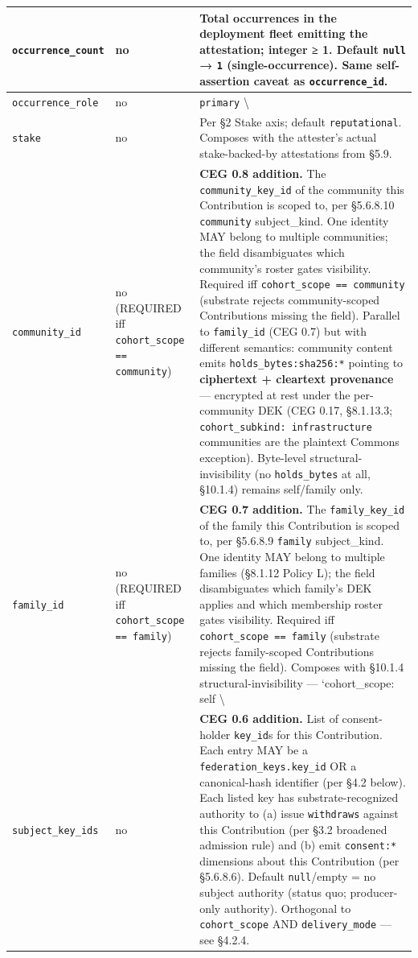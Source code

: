 \documentclass[10pt]{article}
\begin{document}
{\begin{longtable}{|p{5.33cm}|p{5.33cm}|p{5.33cm}|}
\texttt{occurrence\_count} & no & Total occurrences in the deployment fleet emitting the attestation; integer ≥ 1. Default \texttt{null} → \texttt{1} (single-occurrence). Same self-assertion caveat as \texttt{occurrence\_id}. \\ \hline
\texttt{occurrence\_role} & no & \texttt{primary} \textbackslash{} \\ \hline
\texttt{stake} & no & Per §2 Stake axis; default \texttt{reputational}. Composes with the attester's actual stake-backed-by attestations from §5.9. \\ \hline
\texttt{community\_id} & no (REQUIRED iff \texttt{cohort\_scope == community}) & \textbf{CEG 0.8 addition.} The \texttt{community\_key\_id} of the community this Contribution is scoped to, per §5.6.8.10 \texttt{community} subject\_kind. One identity MAY belong to multiple communities; the field disambiguates which community's roster gates visibility. Required iff \texttt{cohort\_scope == community} (substrate rejects community-scoped Contributions missing the field). Parallel to \texttt{family\_id} (CEG 0.7) but with different semantics: community content emits \texttt{holds\_bytes:sha256:*} pointing to \textbf{ciphertext + cleartext provenance} — encrypted at rest under the per-community DEK (CEG 0.17, §8.1.13.3; \texttt{cohort\_subkind: infrastructure} communities are the plaintext Commons exception). Byte-level structural-invisibility (no \texttt{holds\_bytes} at all, §10.1.4) remains self/family only. \\ \hline
\texttt{family\_id} & no (REQUIRED iff \texttt{cohort\_scope == family}) & \textbf{CEG 0.7 addition.} The \texttt{family\_key\_id} of the family this Contribution is scoped to, per §5.6.8.9 \texttt{family} subject\_kind. One identity MAY belong to multiple families (§8.1.12 Policy L); the field disambiguates which family's DEK applies and which membership roster gates visibility. Required iff \texttt{cohort\_scope == family} (substrate rejects family-scoped Contributions missing the field). Composes with §10.1.4 structural-invisibility — `cohort\_scope: self \textbackslash{} \\ \hline
\texttt{subject\_key\_ids} & no & \textbf{CEG 0.6 addition.} List of consent-holder \texttt{key\_id}s for this Contribution. Each entry MAY be a \texttt{federation\_keys.key\_id} OR a canonical-hash identifier (per §4.2 below). Each listed key has substrate-recognized authority to (a) issue \texttt{withdraws} against this Contribution (per §3.2 broadened admission rule) and (b) emit \texttt{consent:*} dimensions about this Contribution (per §5.6.8.6). Default \texttt{null}/empty = no subject authority (status quo; producer-only authority). Orthogonal to \texttt{cohort\_scope} AND \texttt{delivery\_mode} — see §4.2.4. \\ \hline

\end{longtable}}
\end{document}
